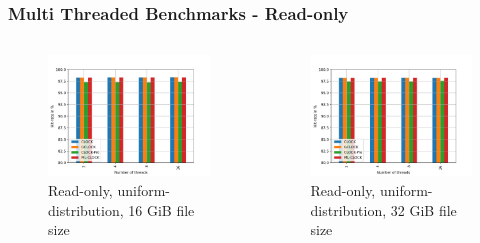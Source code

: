 \documentclass[
	aspectratio=169,
	compress,
]{beamer}
\newcommand{\navframetitle}[1]{\frametitle{#1\hfill{\footnotesize\lastsection{}}}}
\begin{document}
\begin{frame}[fragile]
	\navframetitle{Multi Threaded Benchmarks - Read-only}

	\begin{columns}
		\begin{column}{0.5\textwidth}
			\begin{figure}[ht]
    			\centering
    			\includegraphics[width=\textwidth]{multi_16_gb_randread_uniform.jpg}
        		\caption{Read-only, uniform-distribution, 16 GiB file size}
			\end{figure}
		\end{column}
		\begin{column}{0.5\textwidth}
			\begin{figure}[ht]
    			\centering
    			\includegraphics[width=\textwidth]{multi_32_gb_randread_uniform.jpg}
        		\caption{Read-only, uniform-distribution, 32 GiB file size}
			\end{figure}			
		\end{column}
	\end{columns}
\end{frame}
\end{document}
